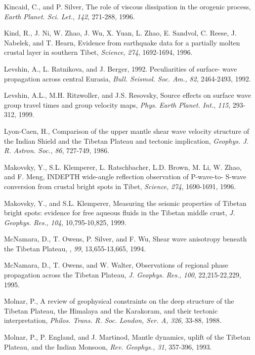 \documentclass[12pt]{article}
\begin{document}
\begin{references}
Kincaid, C., and P. Silver, The role of viscous dissipation in the orogenic
process, {\it Earth Planet. Sci. Let.}, {\it 142}, 271-288, 1996.

Kind, R., J. Ni, W. Zhao, J. Wu, X. Yuan, L. Zhao, E. Sandvol, C. Reese,
J. Nabelek, and T. Hearn, Evidence from earthquake data for a partially
molten crustal layer in southern Tibet, {\it Science,} {\it 274}, 1692-1694,
1996.

Levshin, A., L. Ratnikova, and J. Berger, 1992. Peculiarities of surface-
wave propagation across central Eurasia, {\it Bull. Seismol. Soc. Am.,}
{\it 82}, 2464-2493, 1992.

Levshin, A.L., M.H. Ritzwoller, and J.S. Resovsky, Source effects on
surface wave group travel times and group velocity maps, {\it Phys.
Earth Planet. Int.}, {\it 115}, 293-312, 1999.

Lyon-Caen, H., Comparison of the upper mantle shear wave velocity
structure of the Indian Shield and the Tibetan Plateau and tectonic
implication, {\it Geophys. J. R. Astron. Soc.,} {\it 86}, 727-749, 1986.

Makovsky, Y., S.L. Klemperer, L. Ratschbacher, L.D. Brown, M. Li, W. Zhao,
and F. Meng, INDEPTH wide-angle reflection observation of P-wave-to-
S-wave conversion from crustal bright spots in Tibet, {\it Science,} {\it 274},
1690-1691, 1996.

Makovsky, Y., and S.L. Klemperer, Measuring the seismic properties
of Tibetan bright spots: evidence for free aqueous fluids in the Tibetan
middle crust, {\it J. Geophys. Res.,} {\it 104}, 10,795-10,825, 1999.

McNamara, D., T. Owens, P. Silver, and F. Wu, Shear wave
anisotropy beneath the Tibetan
Plateau, \jgr, {\it 99}, 13,655-13,665, 1994.

McNamara, D., T. Owens, and W. Walter, Observations of 
regional phase propagation across the Tibetan Plateau, {\it J. Geophys. Res.,}
{\it 100}, 22,215-22,229, 1995.

Molnar, P., A review of geophysical constraints on the deep structure
of the Tibetan Plateau, the Himalaya and the Karakoram, and their tectonic
interpretation, {\it Philos. Trans. R. Soc. London, Ser. A,} {\it 326}, 33-88,
1988.

Molnar, P., P. England, and J. Martinod, Mantle dynamics, uplift of the 
Tibetan Plateau, and the Indian Monsoon, {\it Rev. Geophys., 31}, 357-396, 1993.


\end{references}
\end{document}
